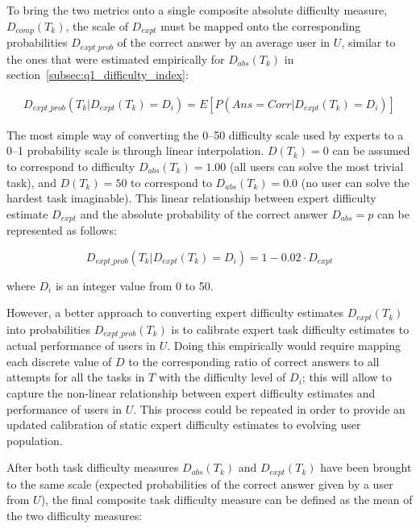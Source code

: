 To bring the two metrics onto a single composite absolute difficulty measure, $D_{comp}(T_k)$, the scale of $D_{expt}$ must be mapped onto the corresponding probabilities $D_{expt\_prob}$ of the correct answer by an average user in $U$, similar to the ones that were estimated empirically for $D_{abs}(T_k)$ in section~\ref{subsec:q1_difficulty_index}:

\begin{equation}
    \begin{split}
        D_{expt\_prob}(T_k | D_{expt}(T_k) = D_i) = E[P(Ans=Corr | D_{expt}(T_k) = D_i)]
    \end{split}
\end{equation}

The most simple way of converting the 0--50 difficulty scale used by experts to a 0--1 probability scale is through linear interpolation.
$D(T_k)=0$ can be assumed to correspond to difficulty $D_{abs}(T_k)=1.00$ (all users can solve the most trivial task), and $D(T_k)=50$ to correspond to $D_{abs}(T_k)=0.0$ (no user can solve the hardest task imaginable).
This linear relationship between expert difficulty estimate $D_{expt}$ and the absolute probability of the correct answer $D_{abs}=p$ can be represented as follows:

\begin{equation} \label{eq:dexpt_to_dabs_conversion}
    D_{expt\_prob}(T_k | D_{expt}(T_k) = D_i) = 1 - 0.02 \cdot D_{expt}
\end{equation}

where $D_i$ is an integer value from 0 to 50.

However, a better approach to converting expert difficulty estimates $D_{expt}(T_k)$ into probabilities $D_{expt\_prob}(T_k)$ is to calibrate expert task difficulty estimates to actual performance of users in $U$.
Doing this empirically would require mapping each discrete value of $D$ to the corresponding ratio of correct answers to all attempts for all the tasks in $T$ with the difficulty level of $D_i$;
this will allow to capture the non-linear relationship between expert difficulty estimates and performance of users in $U$.
This process could be repeated in order to provide an updated calibration of static expert difficulty estimates to evolving user population.

After both task difficulty measures $D_{abs}(T_k)$ and $D_{expt}(T_k)$ have been brought to the same scale (expected probabilities of the correct answer given by a user from $U$), the final composite task difficulty measure can be defined as the mean of the two difficulty measures:

